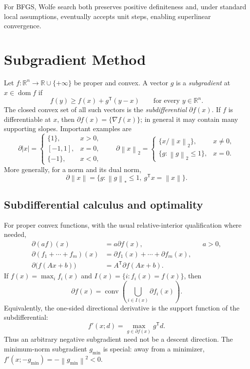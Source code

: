 \documentclass[12pt,oneside]{book}
\numberwithin{equation}{section}
\theoremstyle{definition}
\theoremstyle{plain}
\theoremstyle{remark}
\newcommand{\R}{\mathbb{R}}
\newcommand{\norm}[1]{\left\lVert #1 \right\rVert}
\newcommand{\abs}[1]{\left\lvert #1 \right\rvert}
\begin{document}
For BFGS, Wolfe search both preserves positive definiteness and, under standard
local assumptions, eventually accepts unit steps, enabling superlinear
convergence.

\section{Subgradient Method}

Let $f:\R^n\to\R\cup\{+\infty\}$ be proper and convex. A vector $g$ is a
\emph{subgradient} at $x\in\operatorname{dom} f$ if
\[
    f(y)\geq f(x)+g^\mathsf T(y-x)\qquad\text{for every }y\in\R^n.
\]
The closed convex set of all such vectors is the \emph{subdifferential}
$\partial f(x)$. If $f$ is differentiable at $x$, then
$\partial f(x)=\{\nabla f(x)\}$; in general it may contain many supporting
slopes. Important examples are
\[
 \partial\abs{x}=\begin{cases}
   \{1\},&x>0,\\[-2pt]
   [-1,1],&x=0,\\[-2pt]
   \{-1\},&x<0,
 \end{cases}
 \qquad
 \partial\norm{x}_2=\begin{cases}
   \{x/\norm{x}_2\},&x\neq0,\\
   \{g:\norm{g}_2\leq1\},&x=0.
 \end{cases}
\]
More generally, for a norm and its dual norm,
\[
 \partial\norm{x}=\{g:\norm{g}_*\leq1,\ g^\mathsf Tx=\norm{x}\}.
\]

\subsection{Subdifferential calculus and optimality}

For proper convex functions, with the usual relative-interior qualification
where needed,
\begin{align*}
 \partial(af)(x)&=a\partial f(x), &&a>0,\\
 \partial(f_1+\cdots+f_m)(x)&=\partial f_1(x)+\cdots+\partial f_m(x),\\
 \partial\bigl(f(Ax+b)\bigr)&=A^\mathsf T\partial f(Ax+b).
\end{align*}
If $f(x)=\max_i f_i(x)$ and $I(x)=\{i:f_i(x)=f(x)\}$, then
\[
 \partial f(x)=\operatorname{conv}\!\left(\bigcup_{i\in I(x)}\partial f_i(x)\right).
\]
Equivalently, the one-sided directional derivative is the support function
of the subdifferential:
\[
 f'(x;d)=\max_{g\in\partial f(x)}g^\mathsf Td.
\]
Thus an arbitrary negative subgradient need not be a descent direction. The
minimum-norm subgradient $g_{\min}$ is special: away from a minimizer,
$f'(x;-g_{\min})=-\norm{g_{\min}}^2<0$.
\end{document}
